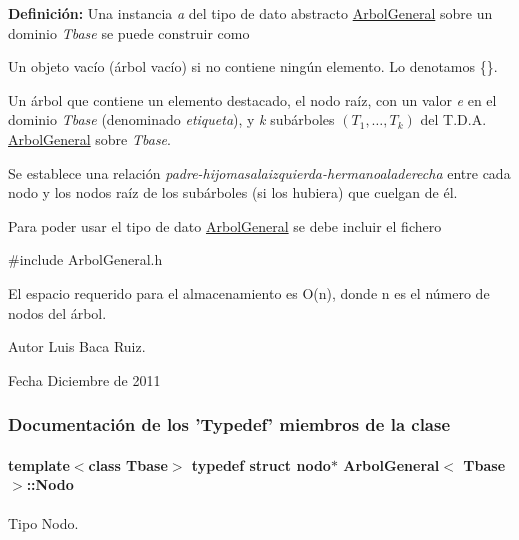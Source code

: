 {\bfseries Definición\-:} Una instancia {\itshape a} del tipo de dato abstracto \hyperlink{classArbolGeneral}{Arbol\-General} sobre un dominio {\itshape Tbase} se puede construir como


\begin{DoxyItemize}
\item Un objeto vacío (árbol vacío) si no contiene ningún elemento. Lo denotamos \{\}.
\item Un árbol que contiene un elemento destacado, el nodo raíz, con un valor {\itshape e} en el dominio {\itshape Tbase} (denominado {\itshape etiqueta}), y {\itshape k} subárboles $(T_1, \ldots, T_k)$ del T.\-D.\-A. \hyperlink{classArbolGeneral}{Arbol\-General} sobre {\itshape Tbase}.
\end{DoxyItemize}

Se establece una relación {\itshape padre-\/hijomasalaizquierda-\/hermanoaladerecha} entre cada nodo y los nodos raíz de los subárboles (si los hubiera) que cuelgan de él.

Para poder usar el tipo de dato \hyperlink{classArbolGeneral}{Arbol\-General} se debe incluir el fichero

{\ttfamily \#include Arbol\-General.\-h}

El espacio requerido para el almacenamiento es O(n), donde n es el número de nodos del árbol.

\begin{DoxyAuthor}{Autor}
Luis Baca Ruiz. 
\end{DoxyAuthor}
\begin{DoxyDate}{Fecha}
Diciembre de 2011 
\end{DoxyDate}


\subsubsection{Documentación de los 'Typedef' miembros de la clase}
\hypertarget{classArbolGeneral_a12cc1b74a9095d89bc7334290d332f7a}{
\paragraph[{Nodo}]{\setlength{\rightskip}{0pt plus 5cm}template$<$class Tbase$>$ typedef struct {\bf nodo}$\ast$ {\bf Arbol\-General}$<$ Tbase $>$\-::{\bf Nodo}}}\label{classArbolGeneral_a12cc1b74a9095d89bc7334290d332f7a}


Tipo Nodo. 

